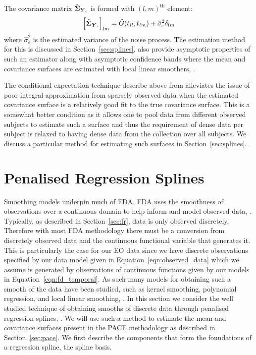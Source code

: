 The covariance matrix $\hat{\bm{{\Sigma}}}_{\bm{{Y}}_{i}}$ is formed with $\left(l, m\right)^\text{th}$ element:
\begin{equation}\label{eqn:sig_cov}
	\left[\hat{\bm{{\Sigma}}}_{\bm{{Y}}_{i}}\right]_{lm} = \hat{G}(t_{il}, t_{im}) + \hat{\sigma}_\varepsilon^2 \delta_{lm}
\end{equation}
where $\hat{\sigma}_\varepsilon^2$ is the estimated variance of the noise process.
The estimation method for this is discussed in Section~\ref{sec:splines}.
\citeauthor{yao_functional_2005} also provide asymptotic properties of such an estimator  along with asymptotic confidence bands where the mean and covariance surfaces are estimated with local linear smoothers, \citep{fan_study_1996}.

The conditional expectation technique describe above from \citep{yao_functional_2005} alleviates the issue of poor integral approximation from sparsely observed data when the estimated covariance surface is a relatively good fit to the true covariance surface.
This is a somewhat better condition as it allows one to pool data from different observed subjects to estimate such a surface and thus the requirement of dense data per subject is relaxed to having dense data from the collection over all subjects.
We discuss a particular method for estimating such surfaces in Section~\ref{sec:splines}.

\section{Penalised Regression Splines \label{sec:splines}}
 Smoothing models underpin much of FDA.
 FDA uses the smoothness of observations over a continuous domain to help inform and model observed data, \citep{ramsay_functional_2010}.
 Typically, as described in Section~\ref{sec:fr}, data is only observed discretely.
 Therefore with most FDA methodology there must be a conversion from discretely observed data and the continuous functional variable that generates it.
 This is particularly the case for our EO data since we have discrete observations specified by our data model given in Equation~\eqref{eqn:observed_data} which we assume is generated by observations of continuous functions given by our models in Equation~\eqref{eqn:fd_temporal}.
 As such many models for obtaining such a smooth of the data have been studied, such as kernel smoothing, polynomial regression, and local linear smoothing, \citep[Chapter~4]{ramsay_functional_2010}. 
 In this section we consider the well studied technique of obtaining smooths of discrete data through penalised regression splines, \citep{ruppert_semiparametric_2003}.
 We will use such a method to estimate the mean and covariance surfaces present in the PACE methodology as described in Section~\ref{sec:pace}. 
 We first describe the components that form the foundations of a regression spline, the spline basis.
 
